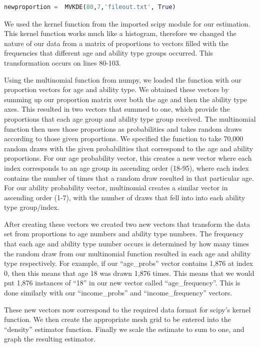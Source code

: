 \documentclass[letterpaper,12pt]{article}
\newcommand{\quotes}[1]{``#1''}
\theoremstyle{definition}
\begin{document}
\begin{spacing}{1.5}
\begin{lstlisting}[language=Python, caption=MVKDE.py]
newproportion =  MVKDE(80,7,'fileout.txt', True)
    \end{lstlisting}


We used the kernel function from the imported scipy module for our estimation. This kernel function works much like a histogram, therefore we changed the nature of our data from a matrix of proportions to vectors filled with the frequencies that different age and ability type groups occurred. This transformation occurs on lines 80-103. 

Using the multinomial function from numpy, we loaded the function with our proportion vectors for age and ability type. We obtained these vectors by summing up our proportion matrix over both the age and then the ability type axes. This resulted in two vectors that summed to one, which provide the proportions that each age group and ability type group received. The multinomial function then uses those proportions as probabilities and takes random draws according to those given proportions. We specified the function to take 70,000 random draws with the given probabilities that correspond to the age and ability proportions. For our age probability vector, this creates a new vector where each index corresponds to an age group in ascending order (18-95), where each index contains the number of times that a random draw resulted in that particular age. For our ability probability vector, multinomial creates a similar vector in ascending order (1-7), with the number of draws that fell into into each ability type group/index.

After creating these vectors we created two new vectors that transform the data set from proportions to age numbers and ability type numbers. The frequency that each age and ability type number occurs is determined by how many times the random draw from our multinomial function resulted in each age and ability type respectively. For example, if our \quotes{age\_probs} vector contains 1,876 at index 0, then this means that age 18 was drawn 1,876 times. This means that we would put 1,876 instances of \quotes{18} in our new vector called \quotes{age\_frequency}. This is done similarly with our \quotes{income\_probs} and \quotes{income\_frequency} vectors.

These new vectors now correspond to the required data format for scipy's kernel function. We then create the appropriate mesh grid to be entered into the \quotes{density} estimator function. Finally we scale the estimate to sum to one, and graph the resulting estimator.


\end{spacing}
\end{document}
